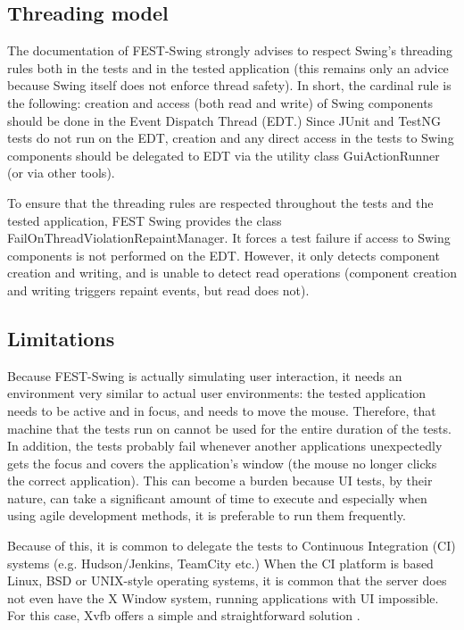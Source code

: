 \subsection{Threading model}

The documentation of FEST-Swing strongly advises to respect Swing's threading rules \cite{OracleSwingThreading} both in the tests and in the tested application (this remains only an advice because Swing itself does not enforce thread safety). In short, the cardinal rule is the following: creation and access (both read and write) of Swing components should be done in the Event Dispatch Thread (EDT.) Since JUnit and TestNG tests do not run on the EDT, creation and any direct access in the tests to Swing components should be delegated to EDT via the utility class GuiActionRunner (or via other tools).

To ensure that the threading rules are respected throughout the tests and the tested application, FEST Swing provides the class FailOnThreadViolationRepaintManager. It forces a test failure if access to Swing components is not performed on the EDT. However, it only detects component creation and writing, and is unable to detect read operations (component creation and writing triggers repaint events, but read does not).

\subsection{Limitations}\label{sec:fest-swing-limitations}

Because FEST-Swing is actually simulating user interaction, it needs an environment very similar to actual user environments: the tested application needs to be active and in focus, and needs to move the mouse. Therefore, that machine that the tests run on cannot be used for the entire duration of the tests. In addition, the tests probably fail whenever another applications unexpectedly gets the focus and covers the application's window (the mouse no longer clicks the correct application). This can become a burden because UI tests, by their nature, can take a significant amount of time to execute and especially when using agile development methods, it is preferable to run them frequently.

Because of this, it is common to delegate the tests to Continuous Integration (CI) systems (e.g. Hudson/Jenkins, TeamCity etc.) When the CI platform is based Linux, BSD or UNIX-style operating systems, it is common that the server does not even have the X Window system, running applications with UI impossible. For this case, Xvfb offers a simple and straightforward solution \cite{FESTxvfb}.

